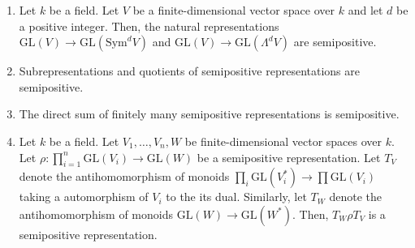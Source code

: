 \begin{lemma}\label{semipos_rep_examples}
\begin{enumerate}
\item\label{sym_and_wedge_semipos} Let $k$ be a field. 
Let $V$ be a finite-dimensional vector space over $k$ and let $d$ be a positive integer. Then, the natural representations $\mathrm{GL}(V)\to \mathrm{GL}(\mathrm{Sym}^dV)$ and $\mathrm{GL}(V)\to \mathrm{GL}(\Lambda^dV)$ are semipositive.
\item\label{subreps_and_quotients_semipos} Subrepresentations and quotients of semipositive representations are semipositive.
\item The direct sum of finitely many semipositive representations is semipositive.
\item 
Let $k$ be a field. 
Let $V_1,\ldots,V_n,W$ be finite-dimensional vector spaces over $k$.
Let $\rho:\prod_{i=1}^{n}\mathrm{GL}(V_i)\rightarrow \mathrm{GL}(W)$ be a semipositive representation. 
Let $T_V$ denote the antihomomorphism of monoids $\prod_i\mathrm{GL}(V_i^*)\to\prod\mathrm{GL}(V_i)$ taking a automorphism of $V_i$ to the its dual.
Similarly, let $T_W$ denote the antihomomorphism of monoids $\mathrm{GL}(W)\to\mathrm{GL}(W^*)$.
Then, $T_W\rho T_V$ is a semipositive representation.
\end{enumerate}
\end{lemma}

